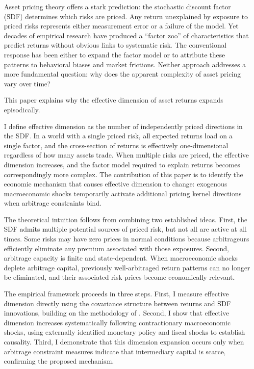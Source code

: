 \documentclass[12pt,letterpaper]{article}
\theoremstyle{plain}
\theoremstyle{definition}
\begin{document}
Asset pricing theory offers a stark prediction: the stochastic discount factor (SDF) determines which risks are priced. Any return unexplained by exposure to priced risks represents either measurement error or a failure of the model. Yet decades of empirical research have produced a ``factor zoo'' of characteristics that predict returns without obvious links to systematic risk. The conventional response has been either to expand the factor model or to attribute these patterns to behavioral biases and market frictions. Neither approach addresses a more fundamental question: why does the apparent complexity of asset pricing vary over time?

This paper explains why the effective dimension of asset returns expands episodically.

I define effective dimension as the number of independently priced directions in the SDF. In a world with a single priced risk, all expected returns load on a single factor, and the cross-section of returns is effectively one-dimensional regardless of how many assets trade. When multiple risks are priced, the effective dimension increases, and the factor model required to explain returns becomes correspondingly more complex. The contribution of this paper is to identify the economic mechanism that causes effective dimension to change: exogenous macroeconomic shocks temporarily activate additional pricing kernel directions when arbitrage constraints bind.

The theoretical intuition follows from combining two established ideas. First, the SDF admits multiple potential sources of priced risk, but not all are active at all times. Some risks may have zero prices in normal conditions because arbitrageurs efficiently eliminate any premium associated with those exposures. Second, arbitrage capacity is finite and state-dependent. When macroeconomic shocks deplete arbitrage capital, previously well-arbitraged return patterns can no longer be eliminated, and their associated risk prices become economically relevant.

The empirical framework proceeds in three steps. First, I measure effective dimension directly using the covariance structure between returns and SDF innovations, building on the methodology of \cite{kozak2018interpreting}. Second, I show that effective dimension increases systematically following contractionary macroeconomic shocks, using externally identified monetary policy and fiscal shocks to establish causality. Third, I demonstrate that this dimension expansion occurs only when arbitrage constraint measures indicate that intermediary capital is scarce, confirming the proposed mechanism.
\end{document}
